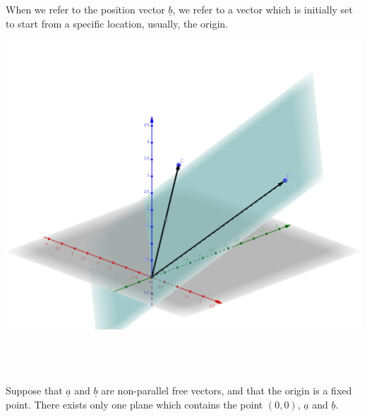 \documentclass[12pt, a4paper]{report}
\theoremstyle{definition}
\begin{document}
	When we refer to the position vector  $\underline{b}$, we refer to a vector which is initially set to start from a specific location, usually, the origin.\\
	\setlength{\columnseprule}{0pt} 
	\begin{multicols}{2}
		\begin{center}
			\includegraphics[scale=0.16]{vect_2} 
		\end{center}
		\begin{center}
			~\\~\\~\\
			Suppose that  $\underline{a}$ and  $\underline{b}$ are non-parallel free vectors, and that the origin is a fixed point. There exists only one plane which contains the point $(0,0)$,  $\underline{a}$ and  $\underline{b}$.
		\end{center}
		
	\end{multicols}
	
\end{document}
